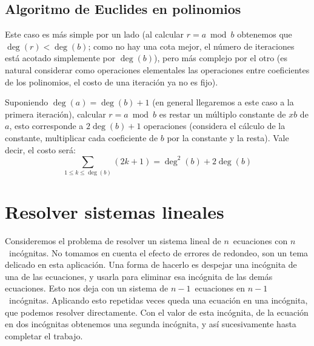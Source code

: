 \subsection{Algoritmo de Euclides en polinomios}
\label{sec:gcd-polynomial}

  Este caso es más simple por un lado
  (al calcular \(r = a \bmod b\) obtenemos que \(\deg(r) < \deg(b)\);
   como no hay una cota mejor,
   el número de iteraciones está acotado simplemente por \(\deg(b)\)),
  pero más complejo por el otro
  (es natural considerar como operaciones elementales
   las operaciones entre coeficientes de los polinomios,
   el costo de una iteración ya no es fijo).

  Suponiendo \(\deg(a) = \deg(b) + 1\)
  (en general llegaremos a este caso a la primera iteración),
  calcular \(r = a \bmod b\)
  es restar un múltiplo constante de \(x b\) de \(a\),
  esto corresponde a \(2 \deg(b) + 1\) operaciones
  (considera el cálculo de la constante,
   multiplicar cada coeficiente de \(b\) por la constante
   y la resta).
  Vale decir,
  el costo será:
  \begin{equation*}
    \sum_{1 \le k \le \deg(b)} (2 k + 1)
      = \deg^2(b) + 2 \deg(b)
  \end{equation*}

\section{Resolver sistemas lineales}
\label{sec:Gauss-elimination}

  Consideremos el problema de resolver un sistema lineal de \(n\)~ecuaciones
  con \(n\)~incógnitas.
  No tomamos en cuenta el efecto de errores de redondeo,
  son un tema delicado en esta aplicación.
  Una forma de hacerlo es despejar una incógnita de una de las ecuaciones,
  y usarla para eliminar esa incógnita de las demás ecuaciones.
  Esto nos deja con un sistema de \(n - 1\)~ecuaciones
  en \(n - 1\)~incógnitas.
  Aplicando esto repetidas veces queda una ecuación en una incógnita,
  que podemos resolver directamente.
  Con el valor de esta incógnita,
  de la ecuación en dos incógnitas obtenemos una segunda incógnita,
  y así sucesivamente hasta completar el trabajo.

